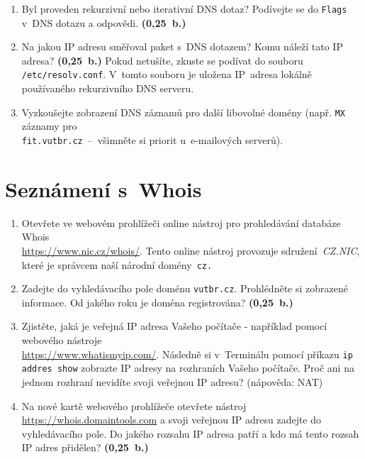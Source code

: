\begin{enumerate}
    \item Byl proveden rekurzivní nebo iterativní DNS dotaz? Podívejte se do \texttt{Flags} v~DNS dotazu a odpovědi. \textbf{(0,25~b.)}
    \item Na jakou IP adresu směřoval paket s~DNS dotazem? Komu náleží tato IP adresa? \textbf{(0,25~b.)} Pokud netušíte, zkuste se podívat do souboru \texttt{/etc/resolv.conf}. V~tomto souboru je uložena IP~adresa lokálně používaného rekurzivního DNS serveru.
    \item Vyzkoušejte zobrazení DNS záznamů pro další libovolné domény (např. \texttt{MX} záznamy pro\\ \texttt{fit.vutbr.cz}~--~všimněte si priorit u~e-mailových serverů).
\end{enumerate}

\section{Seznámení s~Whois}
\begin{enumerate}
    \item Otevřete ve webovém prohlížeči online nástroj pro prohledávání databáze Whois\\ \url{https://www.nic.cz/whois/}. Tento online nástroj provozuje sdružení~\emph{CZ.NIC}, které je správcem naší národní domény~\texttt{cz.}
    \item Zadejte do vyhledávacího pole doménu \texttt{vutbr.cz}. Prohlédněte si zobrazené informace. Od jakého roku je doména registrována? \textbf{(0,25~b.)}
    \item Zjistěte, jaká je veřejná IP adresa Vašeho počítače - například pomocí webového nástroje\\ \url{https://www.whatismyip.com/}. Následně si v~Terminálu pomocí příkazu \texttt{ip addres show} zobrazte IP adresy na rozhraních Vašeho počítače. Proč ani na jednom rozhraní nevidíte svoji veřejnou IP adresu? (nápověda: NAT)
    \item Na nové kartě webového prohlížeče otevřete nástroj \url{https://whois.domaintools.com} a svoji veřejnou IP adresu zadejte do vyhledávacího pole. Do jakého rozsahu IP adresa patří a kdo má tento rozsah IP adres přidělen? \textbf{(0,25~b.)}
\end{enumerate}

